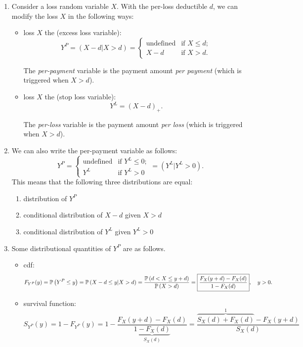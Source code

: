 \begin{enumerate}
\item Consider a loss random variable \(X\). With the per-loss deductible
\(d\), we can modify the loss \(X\) in the following ways:
\begin{itemize}
\item loss \(X\)  the  (excess
loss variable):
\[
Y^P=(X-d|X>d)=\begin{cases}
\text{undefined}&\text{if \(X\le d\)};\\
X-d&\text{if \(X>d\)}.
\end{cases}
\]
\begin{note}
The \emph{per-payment} variable is the payment amount \emph{per payment} (which
is triggered when \(X>d\)).
\end{note}
\item loss \(X\)  the  (stop loss
variable):
\[
Y^L=(X-d)_{+}.
\]
\begin{note}
The \emph{per-loss} variable is the payment amount \emph{per loss} (which
is triggered when \(X>d\)).
\end{note}
\end{itemize}
\item \label{it:yp-expr-yl}
We can also write the per-payment variable as follows:
\[
Y^P=\begin{cases}
\text{undefined}&\text{if \(Y^L\le 0\)};\\
Y^L&\text{if \(Y^L>0\)}
\end{cases}
=\boxed{(Y^L|Y^L>0)}.
\]
This means that the following three distributions are equal:
\begin{enumerate}
\item distribution of \(Y^P\)
\item conditional distribution of \(X-d\) given \(X>d\)
\item conditional distribution of \(Y^L\) given \(Y^L>0\)
\end{enumerate}
\item \label{it:yp-dist-quantities}
Some distributional quantities of \(Y^P\) are as follows.
\begin{itemize}
\item cdf: \[
F_{Y^P}(y)=\mathbb{P}\left(Y^P\le y\right)=\mathbb{P}\left(X-d\le y|X>d\right)=\frac{\mathbb{P}\left(d<X\le y+d\right)}{\mathbb{P}\left(X>d\right)}
=\boxed{\frac{F_X(y+d)-F_X(d)}{1-F_X(d)}},\quad y>0.
\]
\item survival function: 
\[
S_{Y^P}(y)=1-F_{Y^P}(y)=1-\frac{F_X(y+d)-F_X(d)}{\underbrace{1-F_X(d)}_{S_X(d)}}
=\frac{\overbrace{S_X(d)+F_X(d)}^{1}-F_X(y+d)}{S_X(d)}
\]
\end{itemize}
\end{enumerate}
